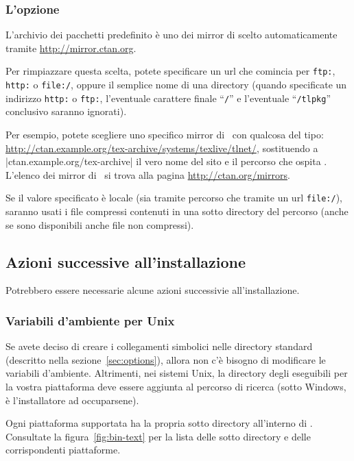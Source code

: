 \documentclass{article}
\begin{document}
\subsubsection{L'opzione }
\label{sec:location}

L'archivio dei pacchetti predefinito è uno dei mirror di \CTAN{}
scelto automaticamente tramite \url{http://mirror.ctan.org}.

Per rimpiazzare questa scelta, potete specificare un url che comincia per
\texttt{ftp:}, \texttt{http:} o \texttt{file:/}, oppure il semplice nome
di una directory (quando specificate un indirizzo \texttt{http:} o
\texttt{ftp:}, l'eventuale carattere finale ``\texttt{/}'' e l'eventuale
``\texttt{/tlpkg}'' conclusivo saranno ignorati).

Per esempio, potete scegliere uno specifico mirror di \CTAN\ con qualcosa
del tipo:
\url{http://ctan.example.org/tex-archive/systems/texlive/tlnet/},
sostituendo a |ctan.example.org/tex-archive| il vero nome del sito e il
percorso che ospita \CTAN. L'elenco dei mirror di \CTAN\ si trova alla
pagina \url{http://ctan.org/mirrors}.

Se il valore specificato è locale (sia tramite percorso che tramite un url
\texttt{file:/}), saranno usati i file compressi contenuti in una sotto
directory  del percorso (anche se sono disponibili anche
file non compressi).


\subsection{Azioni successive all'installazione}
\label{sec:postinstall}

Potrebbero essere necessarie alcune azioni successivie all'installazione.


\subsubsection{Variabili d'ambiente per Unix}
\label{sec:env}

Se avete deciso di creare i collegamenti simbolici nelle directory standard
(descritto nella sezione~\ref{sec:options}), allora non c'è bisogno di
modificare le variabili d'ambiente. Altrimenti, nei sistemi Unix, la
directory degli eseguibili per la vostra piattaforma deve essere aggiunta al
percorso di ricerca (sotto Windows, è l'installatore ad occuparsene).

Ogni piattaforma supportata ha la propria sotto directory all'interno di
. Consultate la figura~\ref{fig:bin-text} per la lista
delle sotto directory e delle corrispondenti piattaforme.
\end{document}
